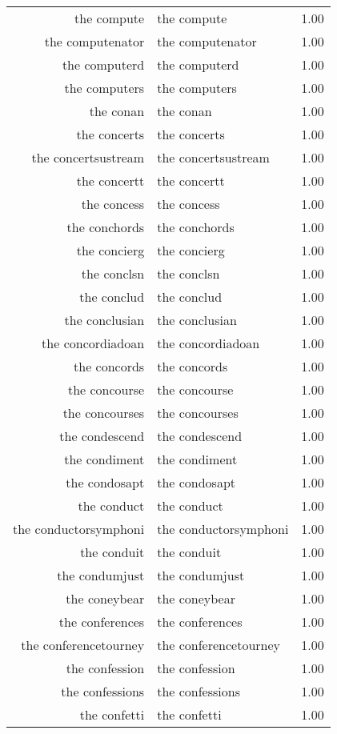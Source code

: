 \begin{table}[ht]
\begin{tabular}{rlr}
  the compute & the compute & 1.00 \\ 
  the computenator & the computenator & 1.00 \\ 
  the computerd & the computerd & 1.00 \\ 
  the computers & the computers & 1.00 \\ 
  the conan & the conan & 1.00 \\ 
  the concerts & the concerts & 1.00 \\ 
  the concertsustream & the concertsustream & 1.00 \\ 
  the concertt & the concertt & 1.00 \\ 
  the concess & the concess & 1.00 \\ 
  the conchords & the conchords & 1.00 \\ 
  the concierg & the concierg & 1.00 \\ 
  the conclsn & the conclsn & 1.00 \\ 
  the conclud & the conclud & 1.00 \\ 
  the conclusian & the conclusian & 1.00 \\ 
  the concordiadoan & the concordiadoan & 1.00 \\ 
  the concords & the concords & 1.00 \\ 
  the concourse & the concourse & 1.00 \\ 
  the concourses & the concourses & 1.00 \\ 
  the condescend & the condescend & 1.00 \\ 
  the condiment & the condiment & 1.00 \\ 
  the condosapt & the condosapt & 1.00 \\ 
  the conduct & the conduct & 1.00 \\ 
  the conductorsymphoni & the conductorsymphoni & 1.00 \\ 
  the conduit & the conduit & 1.00 \\ 
  the condumjust & the condumjust & 1.00 \\ 
  the coneybear & the coneybear & 1.00 \\ 
  the conferences & the conferences & 1.00 \\ 
  the conferencetourney & the conferencetourney & 1.00 \\ 
  the confession & the confession & 1.00 \\ 
  the confessions & the confessions & 1.00 \\ 
  the confetti & the confetti & 1.00 \\ 

\end{tabular}
\end{table}
